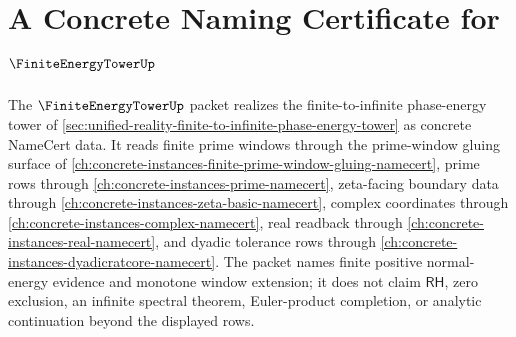 \chapter{A Concrete Naming Certificate for $\FiniteEnergyTowerUp$}
\label{ch:concrete-instances-finite-energy-tower-namecert}

The $\FiniteEnergyTowerUp$ packet realizes the finite-to-infinite phase-energy tower of \autoref{sec:unified-reality-finite-to-infinite-phase-energy-tower} as concrete NameCert data. It reads finite prime windows through the prime-window gluing surface of \autoref{ch:concrete-instances-finite-prime-window-gluing-namecert}, prime rows through \autoref{ch:concrete-instances-prime-namecert}, zeta-facing boundary data through \autoref{ch:concrete-instances-zeta-basic-namecert}, complex coordinates through \autoref{ch:concrete-instances-complex-namecert}, real readback through \autoref{ch:concrete-instances-real-namecert}, and dyadic tolerance rows through \autoref{ch:concrete-instances-dyadicratcore-namecert}. The packet names finite positive normal-energy evidence and monotone window extension; it does not claim $\mathsf{RH}$, zero exclusion, an infinite spectral theorem, Euler-product completion, or analytic continuation beyond the displayed rows.


